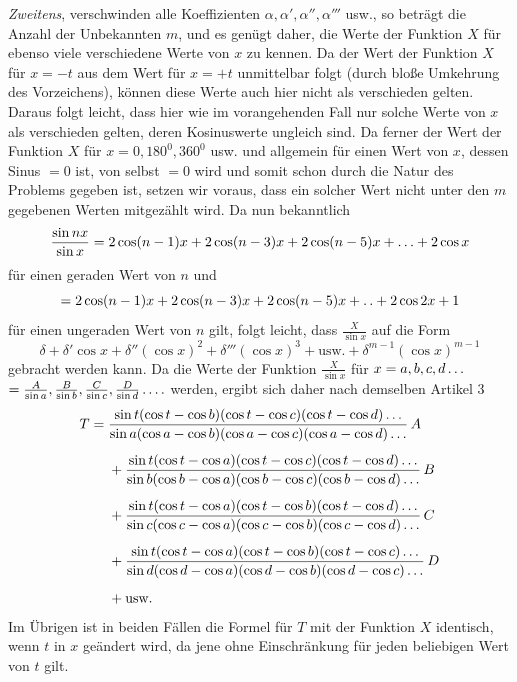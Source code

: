 \textit{Zweitens}, verschwinden alle Koeffizienten \(\alpha,\alpha',\alpha'',\alpha'''\) usw., so beträgt die Anzahl der Unbekannten \(m\), und es genügt daher, die Werte der Funktion \(X\) für ebenso viele verschiedene Werte von \(x\) zu kennen. Da der Wert der Funktion \(X\) für \(x=-t\) aus dem Wert für
\(x=+t\) unmittelbar folgt (durch bloße Umkehrung des Vorzeichens), können diese Werte auch hier nicht als verschieden gelten. Daraus folgt leicht, dass hier wie im vorangehenden Fall nur solche Werte von \(x\) als verschieden gelten, deren Kosinuswerte ungleich sind. Da ferner der Wert der Funktion \(X\) für \(x=0,180^0,360^0\)
usw. und allgemein für einen Wert von \(x\), dessen Sinus \(=0\) ist, von selbst \(=0\) wird
und somit schon durch die Natur des Problems gegeben ist, setzen wir voraus, dass ein solcher Wert nicht unter den \(m\) gegebenen Werten mitgezählt wird. Da nun bekanntlich
\[
\frac{\sin nx}{\sin x}=2\cos(n-1)x+2\cos(n-3)x+2\cos(n-5)x+\mathinner{.\,.\,.}+2\cos x
\]
für einen geraden Wert von \(n\) und
\[
=2\cos(n-1)x+2\cos(n-3)x+2\cos(n-5)x+\mathinner{.\,.}+2\cos 2x+1
\]
für einen ungeraden Wert von \(n\) gilt, folgt leicht, dass \(\frac{X}{\sin x}\) auf die Form
\[
\delta+\delta'\cos x+\delta''(\cos x)^2+\delta'''(\cos x)^3+\text{usw.}+\delta^{m-1}(\cos x)^{m-1}
\]
gebracht werden kann. Da die Werte der Funktion \(\frac{X}{\sin x}\) für \(x=a,b,c,d\mathinner{.\,.\,.}\)
\(=\frac{A}{\sin a},\frac{B}{\sin b},\frac{C}{\sin c},\frac{D}{\sin d}\mathinner{.\,.\,.\,.}\) werden, ergibt sich daher nach demselben Artikel 3
\[
\begin{aligned}
T={}&\frac{\sin t(\cos t-\cos b)(\cos t-\cos c)(\cos t-\cos d)\mathinner{.\,.\,.}}{\sin a(\cos a-\cos b)(\cos a-\cos c)(\cos a-\cos d)\mathinner{.\,.\,.}}\,A\\[5pt]
&+\frac{\sin t(\cos t-\cos a)(\cos t-\cos c)(\cos t-\cos d)\mathinner{.\,.\,.}}{\sin b(\cos b-\cos a)(\cos b-\cos c)(\cos b-\cos d)\mathinner{.\,.\,.}}\,B\\[5pt]
&+\frac{\sin t(\cos t-\cos a)(\cos t-\cos b)(\cos t-\cos d)\mathinner{.\,.\,.}}{\sin c(\cos c-\cos a)(\cos c-\cos b)(\cos c-\cos d)\mathinner{.\,.\,.}}\,C\\[5pt]
&+\frac{\sin t(\cos t-\cos a)(\cos t-\cos b)(\cos t-\cos c)\mathinner{.\,.\,.}}{\sin d(\cos d-\cos a)(\cos d-\cos b)(\cos d-\cos c)\mathinner{.\,.\,.}}\,D\\[5pt]
&+\text{usw.}
\end{aligned}
\]
Im Übrigen ist in beiden Fällen die Formel für \(T\) mit der Funktion \(X\) identisch, wenn
\(t\) in \(x\) geändert wird, da jene ohne Einschränkung für jeden beliebigen Wert von \(t\) gilt.

\endgroup
